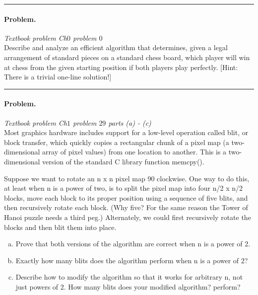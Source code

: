 \documentclass[11pt]{article}
\begin{document}
\hrule

\newpage



\paragraph{Problem.} \textit{Textbook problem Ch$0$ problem $0$} \\
\noindent Describe and analyze an efficient algorithm that determines, given a legal arrangement of standard pieces on a standard chess board, which player will
win at chess from the given starting position if both players play perfectly. [Hint: There is a trivial one-line solution!]

\hrule

\begin{solution}


\end{solution}



\paragraph{Problem.} \textit{Textbook problem Ch$1$ problem $29$ parts (a) - (c)} \\
\noindent Most graphics hardware includes support for a low-level operation called blit,
or block transfer, which quickly copies a rectangular chunk of a pixel map (a two-dimensional array of pixel values) from one location to another. This
is a two-dimensional version of the standard C library function memcpy().

Suppose we want to rotate an n x n pixel map 90 clockwise. One way to
do this, at least when n is a power of two, is to split the pixel map into four
n/2 x n/2 blocks, move each block to its proper position using a sequence of
five blits, and then recursively rotate each block. (Why five? For the same
reason the Tower of Hanoi puzzle needs a third peg.) Alternately, we could
first recursively rotate the blocks and then blit them into place.

\begin{enumerate}[(a)]
    \item Prove that both versions of the algorithm are correct when n is a power of 2.
    \item Exactly how many blits does the algorithm perform when n is a power of 2?
    \item Describe how to modify the algorithm so that it works for arbitrary n, not just powers of 2. How many blits does your modified algorithm?
perform?
\end{enumerate}
\end{document}
